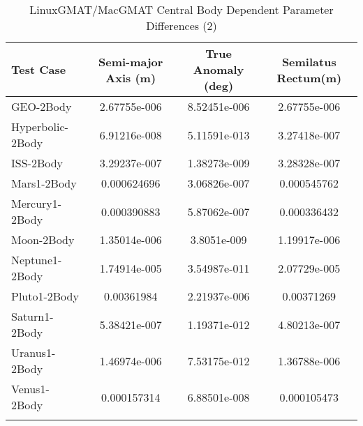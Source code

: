 \begin{table}[htbp!]
\centering
\caption{ LinuxGMAT/MacGMAT Central Body Dependent Parameter Differences (2)}
      \begin{tabular}{lccc}
      \hline\hline
          Test Case & Semi-major Axis (m) & True Anomaly (deg) & Semilatus Rectum(m) \\
         \hline
         GEO-2Body & 2.67755e-006 & 8.52451e-006 & 2.67755e-006 \\
         Hyperbolic-2Body & 6.91216e-008 & 5.11591e-013 & 3.27418e-007 \\
         ISS-2Body & 3.29237e-007 & 1.38273e-009 & 3.28328e-007 \\
         Mars1-2Body & 0.000624696 & 3.06826e-007 & 0.000545762 \\
         Mercury1-2Body & 0.000390883 & 5.87062e-007 & 0.000336432 \\
         Moon-2Body & 1.35014e-006 & 3.8051e-009 & 1.19917e-006 \\
         Neptune1-2Body & 1.74914e-005 & 3.54987e-011 & 2.07729e-005 \\
         Pluto1-2Body & 0.00361984 & 2.21937e-006 & 0.00371269 \\
         Saturn1-2Body & 5.38421e-007 & 1.19371e-012 & 4.80213e-007 \\
         Uranus1-2Body & 1.46974e-006 & 7.53175e-012 & 1.36788e-006 \\
         Venus1-2Body & 0.000157314 & 6.88501e-008 & 0.000105473 \\
      \hline\hline
      \label{Table: LinuxGMAT-MacGMAT CB Parameters Set 2} 
\end{tabular}
\end{table}
